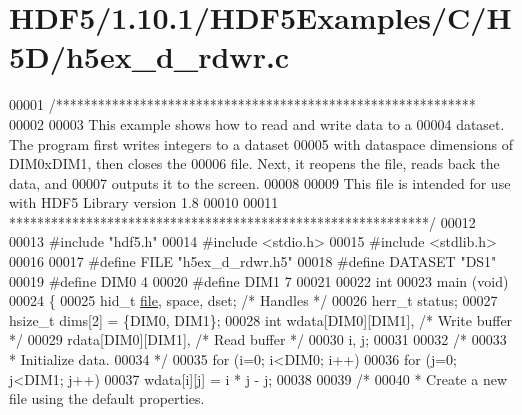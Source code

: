 \hypertarget{_h_d_f5_21_810_81_2_h_d_f5_examples_2_c_2_h5_d_2h5ex__d__rdwr_8c_source}{}\section{H\+D\+F5/1.10.1/\+H\+D\+F5\+Examples/\+C/\+H5\+D/h5ex\+\_\+d\+\_\+rdwr.c}
\label{_h_d_f5_21_810_81_2_h_d_f5_examples_2_c_2_h5_d_2h5ex__d__rdwr_8c_source}

\begin{DoxyCode}
00001 \textcolor{comment}{/************************************************************}
00002 \textcolor{comment}{}
00003 \textcolor{comment}{  This example shows how to read and write data to a}
00004 \textcolor{comment}{  dataset.  The program first writes integers to a dataset}
00005 \textcolor{comment}{  with dataspace dimensions of DIM0xDIM1, then closes the}
00006 \textcolor{comment}{  file.  Next, it reopens the file, reads back the data, and}
00007 \textcolor{comment}{  outputs it to the screen.}
00008 \textcolor{comment}{}
00009 \textcolor{comment}{  This file is intended for use with HDF5 Library version 1.8}
00010 \textcolor{comment}{}
00011 \textcolor{comment}{ ************************************************************/}
00012 
00013 \textcolor{preprocessor}{#include "hdf5.h"}
00014 \textcolor{preprocessor}{#include <stdio.h>}
00015 \textcolor{preprocessor}{#include <stdlib.h>}
00016 
00017 \textcolor{preprocessor}{#define FILE            "h5ex\_d\_rdwr.h5"}
00018 \textcolor{preprocessor}{#define DATASET         "DS1"}
00019 \textcolor{preprocessor}{#define DIM0            4}
00020 \textcolor{preprocessor}{#define DIM1            7}
00021 
00022 \textcolor{keywordtype}{int}
00023 main (\textcolor{keywordtype}{void})
00024 \{
00025     hid\_t       \hyperlink{structfile}{file}, space, dset;          \textcolor{comment}{/* Handles */}
00026     herr\_t      status;
00027     hsize\_t     dims[2] = \{DIM0, DIM1\};
00028     \textcolor{keywordtype}{int}         wdata[DIM0][DIM1],          \textcolor{comment}{/* Write buffer */}
00029                 rdata[DIM0][DIM1],          \textcolor{comment}{/* Read buffer */}
00030                 i, j;
00031 
00032     \textcolor{comment}{/*}
00033 \textcolor{comment}{     * Initialize data.}
00034 \textcolor{comment}{     */}
00035     \textcolor{keywordflow}{for} (i=0; i<DIM0; i++)
00036         \textcolor{keywordflow}{for} (j=0; j<DIM1; j++)
00037             wdata[i][j] = i * j - j;
00038 
00039     \textcolor{comment}{/*}
00040 \textcolor{comment}{     * Create a new file using the default properties.}

\end{DoxyCode}

